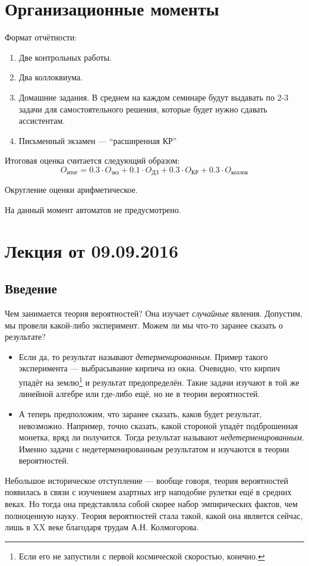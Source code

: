 \documentclass[a4paper,12pt]{article}
\begin{document}
\maketitle

\section{Организационные моменты}
Формат отчётности:
\begin{enumerate}
    \item Две контрольных работы.
    \item Два коллоквиума.
    \item Домашние задания. В среднем на каждом семинаре будут выдавать по 2-3 задачи для самостоятельного решения, которые будет нужно сдавать ассистентам.
    \item Письменный экзамен --- ``расширенная КР''
\end{enumerate}

Итоговая оценка считается следующий образом:
\[O_{\text{итог}} = 0.3 \cdot O_{\text{экз}} + 0.1 \cdot O_{\text{ДЗ}} + 0.3 \cdot O_{\text{КР}} + 0.3 \cdot O_{\text{коллок}}\]

Округление оценки арифметическое.

На данный момент автоматов не предусмотрено.

\section{Лекция от 09.09.2016}

\subsection{Введение}
Чем занимается теория вероятностей? Она изучает \emph{случайные} явления. Допустим, мы провели какой-либо эксперимент. Можем ли мы что-то заранее сказать о результате?
\begin{itemize}
    \item Если да, то результат называют \emph{детерменированным}. Пример такого эксперимента --- выбрасывание кирпича из окна. Очевидно, что кирпич упадёт на землю\footnote{Если его не запустили с первой космической скоростью, конечно.} и результат предопределён. Такие задачи изучают в той же линейной алгебре или где-либо ещё, но не в теории вероятностей.
    \item А теперь предположим, что заранее сказать, каков будет результат, невозможно. Например, точно сказать, какой стороной упадёт подброшенная монетка, вряд ли получится. Тогда результат называют \emph{недетерменированным}. Именно задачи с недетерменированным результатом и изучаются в теории вероятностей.
\end{itemize}
Небольшое историческое отступление --- вообще говоря, теория вероятностей появилась в связи с изучением азартных игр наподобие рулетки ещё в средних веках. Но тогда она представляла собой скорее набор эмпирических фактов, чем полноценную науку. Теория вероятностей стала такой, какой она является сейчас, лишь в XX веке благодаря трудам А.Н. Колмогорова.
\end{document}
